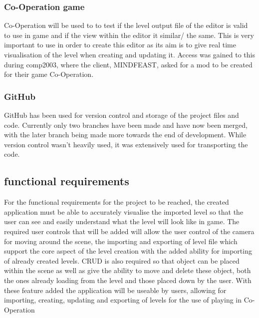 \subsubsection{Co-Operation game}
Co-Operation will be used to to test if the level output file of the editor is valid to use in game and if the view within the editor it similar/ the same. This is very important to use in order to create this editor as its aim is to give real time visualisation of the level when creating and updating it.
Access was gained to this during comp2003, where the client, MINDFEAST, asked for a mod to be created for their game Co-Operation.
\subsubsection{GitHub}
GitHub has been used for version control and storage of the project files and code. Currently only two branches have been made and have now been merged, with the later branch being made more towards the end of development. While version control wasn't heavily used, it was extensively used for transporting the code.

\subsection{functional requirements}
For the functional requirements for the project to be reached, the created application must be able to accurately visualise the imported level so that the user can see and easily understand what the level will look like in game. The required user controls that will be added will allow the user control of the camera for moving around the scene, the importing and exporting of level file which support the core aspect of the level creation with the added ability for importing of already created levels. CRUD is also required so that object can be placed within the scene as well as give the ability to move and delete these object, both the ones already loading from the level and those placed down by the user. With these feature added the application will be useable by users, allowing for importing, creating, updating and exporting of levels for the use of playing in Co-Operation

